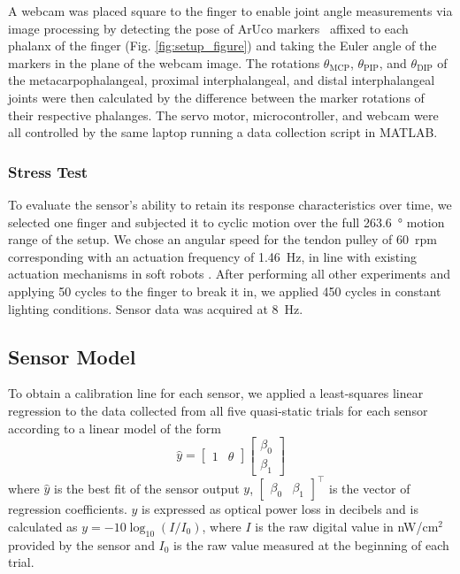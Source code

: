 A webcam was placed square to the finger to enable joint angle measurements via image processing by detecting the pose of ArUco markers~\cite{ArUco} affixed to each phalanx of the finger (Fig. \ref{fig:setup_figure}) and taking the Euler angle of the markers in the plane of the webcam image. The rotations $\theta_\textrm{MCP}$, $\theta_\textrm{PIP}$, and $\theta_\textrm{DIP}$ of the metacarpophalangeal, proximal interphalangeal, and distal interphalangeal joints were then calculated by the difference between the marker rotations of their respective phalanges. The servo motor, microcontroller, and webcam were all controlled by the same laptop running a data collection script in MATLAB. 

\subsubsection{Stress Test}
To evaluate the sensor's ability to retain its response characteristics over time, we selected one finger and subjected it to cyclic motion over the full \qty{263.6}{\degree} motion range of the setup. We chose an angular speed for the tendon pulley of \qty{60}{rpm} corresponding with an actuation frequency of \qty{1.46}{Hz}, in line with existing actuation mechanisms in soft robots \cite{Li2023}. After performing all other experiments and applying 50 cycles to the finger to break it in, we applied 450 cycles in constant lighting conditions. Sensor data was acquired at \qty{8}{Hz}.

\subsection{Sensor Model}\label{subsec:sensor_model}
To obtain a calibration line for each sensor, we applied a least-squares linear regression to the data collected from all five quasi-static trials for each sensor according to a linear model of the form 
\begin{equation}\label{eq:model}
   \hat{y}=\begin{bmatrix}1 & \theta\end{bmatrix}\begin{bmatrix}\beta_0 \\ \beta_1\end{bmatrix}
\end{equation}
where $\hat{y}$ is the best fit of the sensor output $y$, $\begin{bmatrix}\beta_0 & \beta_1\end{bmatrix}^\top$ is the vector of regression coefficients. $y$ is expressed as optical power loss in decibels and is calculated as $y=-10\log_{10}(I/I_0)$, where $I$ is the raw digital value in nW/cm$^{2}$ provided by the sensor and $I_0$ is the raw value measured at the beginning of each trial.

